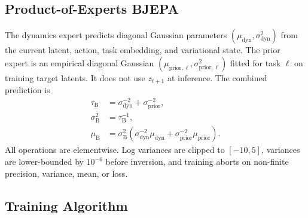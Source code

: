 \documentclass[10pt,twocolumn]{article}
\theoremstyle{tightstyle}
\begin{document}
\subsection{Product-of-Experts BJEPA}

The dynamics expert predicts diagonal Gaussian parameters
$(\mu_{\mathrm{dyn}},\sigma^2_{\mathrm{dyn}})$ from the current latent, action,
task embedding, and variational state. The prior expert is an empirical diagonal
Gaussian $(\mu_{\mathrm{prior},\ell},\sigma^2_{\mathrm{prior},\ell})$ fitted for
task $\ell$ on training target latents. It does not use $z_{t+1}$ at inference.
The combined prediction is
\begin{align}
\tau_{\mathrm{B}} &= \sigma_{\mathrm{dyn}}^{-2}
                   + \sigma_{\mathrm{prior}}^{-2}, \\
\sigma_{\mathrm{B}}^2 &= \tau_{\mathrm{B}}^{-1}, \\
\mu_{\mathrm{B}} &= \sigma_{\mathrm{B}}^2
\left(\sigma_{\mathrm{dyn}}^{-2}\mu_{\mathrm{dyn}}
+\sigma_{\mathrm{prior}}^{-2}\mu_{\mathrm{prior}}\right).
\end{align}
All operations are elementwise. Log variances are clipped to $[-10,5]$, variances
are lower-bounded by $10^{-6}$ before inversion, and training aborts on non-finite
precision, variance, mean, or loss.

\subsection{Training Algorithm}
\end{document}
